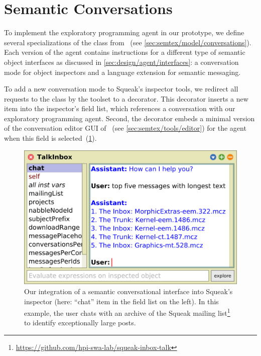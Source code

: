 
\section{Semantic Conversations}
\label{sec:implementation/conversations}

To implement the exploratory programming agent in our prototype, we define several specializations of the  class from \semtex~(see \cref{sec:semtex/model/conversations}).
Each version of the agent contains instructions for a different type of semantic object interfaces as discussed in \cref{sec:design/agent/interfaces}: a conversation mode for object inspectors and a language extension for semantic messaging.

To add a new conversation mode to Squeak's inspector tools, we redirect all requests to the  class by the toolset to a decorator.
This decorator inserts a new  item into the inspector's field list, which references a conversation with our exploratory programming agent.
Second, the decorator embeds a minimal version of the conversation editor GUI of \semtex~(see \cref{sec:semtex/tools/editor}) for the agent when this field is selected~(\cref{fig:implementation/conversations/inspector}).

\begin{figure}
	\begin{minipage}{\textwidth}
		\centering
		\includegraphics[width=.7\textwidth]{03_conversations/inspector.png}
		\caption[Our integration of a semantic conversational interface into Squeak's inspector.]{
			Our integration of a semantic conversational interface into Squeak's inspector (here: ``chat'' item in the field list on the left).
			In this example, the user chats with an archive of the Squeak mailing list\footnote{\url{https://github.com/hpi-swa-lab/squeak-inbox-talk}} to identify exceptionally large posts.
		}
		\label{fig:implementation/conversations/inspector}
	\end{minipage}
\end{figure}

